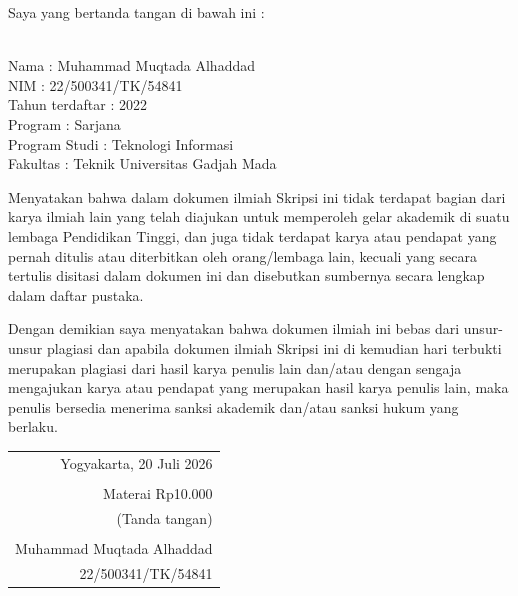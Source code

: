 \noindent Saya yang bertanda tangan di bawah ini :

\vspace{-1em}

\begin{tabbing}
\hspace{40mm} \= \\ %
\noindent Nama \> : Muhammad Muqtada Alhaddad \\[\parskip]
\noindent NIM \> : 22/500341/TK/54841 \\[\parskip]
\noindent Tahun terdaftar \> : 2022 \\[\parskip]
\noindent Program \> : Sarjana \\[\parskip]
\noindent Program Studi \> : Teknologi Informasi \\[\parskip]
\noindent Fakultas \> : Teknik Universitas Gadjah Mada
\end{tabbing}

\noindent Menyatakan bahwa dalam dokumen ilmiah Skripsi ini tidak terdapat bagian dari karya ilmiah lain yang telah diajukan untuk memperoleh gelar akademik di suatu lembaga Pendidikan Tinggi, dan juga tidak terdapat karya atau pendapat yang pernah ditulis atau diterbitkan oleh orang/lembaga lain, kecuali yang secara tertulis disitasi dalam dokumen ini dan disebutkan sumbernya secara lengkap dalam daftar pustaka.

\noindent Dengan demikian saya menyatakan bahwa dokumen ilmiah ini bebas dari unsur-unsur plagiasi dan apabila dokumen ilmiah Skripsi ini di kemudian hari terbukti merupakan plagiasi dari hasil karya penulis lain dan/atau dengan sengaja mengajukan karya atau pendapat yang merupakan hasil karya penulis lain, maka penulis bersedia menerima sanksi akademik dan/atau sanksi hukum yang berlaku.


\begin{flushright}
	\begin{tabular}{r}
		Yogyakarta, 20 Juli 2026 \\
		\vspace{0.1cm} \\
		\tiny{Materai Rp10.000} \\
		\tiny{(Tanda tangan)} \\	
		\vspace{0.1cm} \\
		Muhammad Muqtada Alhaddad \\ 22/500341/TK/54841
	\end{tabular}
\end{flushright}